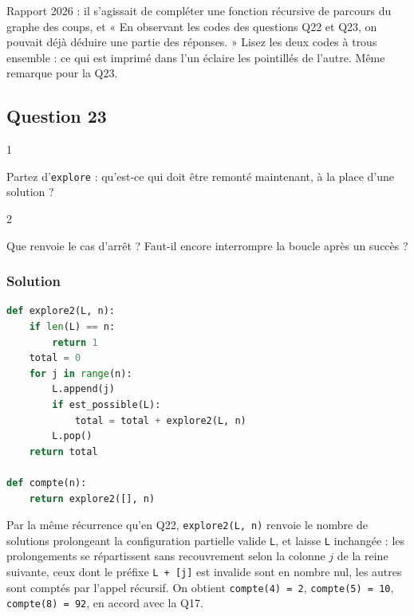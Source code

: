 \documentclass[11pt,a4paper]{article}
\begin{document}
\begin{jury}

Rapport 2026 : il s'agissait de compléter une fonction récursive de parcours du graphe des coups, et « En observant les codes des questions Q22 et Q23, on pouvait déjà déduire une partie des réponses. » Lisez les deux codes à trous ensemble : ce qui est imprimé dans l'un éclaire les pointillés de l'autre. Même remarque pour la Q23.

\end{jury}

\hypertarget{question-23}{%
\subsection{Question 23}\label{question-23}}

\begin{indication}{1}

Partez d'\texttt{explore} : qu'est-ce qui doit être remonté maintenant, à la place d'une solution ?

\end{indication}

\begin{indication}{2}

Que renvoie le cas d'arrêt ? Faut-il encore interrompre la boucle après un succès ?

\end{indication}

\hypertarget{solution-22}{%
\subsubsection{Solution}\label{solution-22}}

\begin{lstlisting}[language=Python]
def explore2(L, n):
    if len(L) == n:
        return 1
    total = 0
    for j in range(n):
        L.append(j)
        if est_possible(L):
            total = total + explore2(L, n)
        L.pop()
    return total

def compte(n):
    return explore2([], n)
\end{lstlisting}

Par la même récurrence qu'en Q22, \texttt{explore2(L,\ n)} renvoie le nombre de solutions prolongeant la configuration partielle valide \texttt{L}, et laisse \texttt{L} inchangée : les prolongements se répartissent sans recouvrement selon la colonne \(j\) de la reine suivante, ceux dont le préfixe \texttt{L\ +\ {[}j{]}} est invalide sont en nombre nul, les autres sont comptés par l'appel récursif. On obtient \texttt{compte(4)\ =\ 2}, \texttt{compte(5)\ =\ 10}, \texttt{compte(8)\ =\ 92}, en accord avec la Q17.
\end{document}
